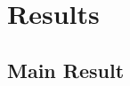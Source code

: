 \documentclass[12pt]{article}
\newcommand{\zT}{\ve{n}}
\newcommand{\lT}{\ve{\lam}}
\begin{document}
% 
%
%
%
%
%

\section{Results}

\subsection{Main Result}
\end{document}
